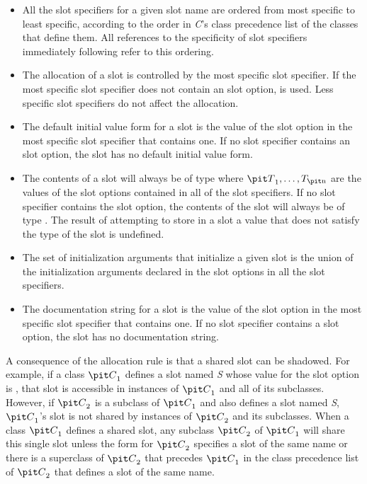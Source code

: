 \begin{itemize}

\item  All the slot specifiers for a given slot name are ordered
from most specific to least specific, according to the order in {\it C\/}'s
class precedence list of the classes that define them. All references
to the specificity of slot specifiers immediately following refer to this
ordering.

\item  The allocation of a slot is controlled by the most specific
slot specifier.  If the most specific slot specifier does not contain an
 slot option,  is used.  Less specific
slot specifiers do not affect the allocation.

\item  The default initial value form for a
slot is the value of the  slot option in the most
specific slot specifier that contains one.  If no slot specifier
contains an  slot option, the slot has no default
initial value form.

\item  The contents of a slot will always be of type 
where ${\it T}\sub 1, \ldots, T\sub {\hbox{\scriptsize\it n}}$ are
the values of the  slot options contained in all of the slot
specifiers.  If no slot specifier contains the  slot option, the
contents of the slot will always be of type . The result
of attempting to store in a slot
a value that does not satisfy the type of the slot is undefined.

\item  The set of initialization arguments that initialize a given
slot is the union of the initialization arguments declared in the 
 slot options in all the slot specifiers.

\item  The documentation string for a slot is the value of the
 slot option in the most specific slot specifier
that contains one.  If no slot specifier contains a 
 slot option, the slot has no documentation string.
\end{itemize}

A consequence of the allocation rule is that a shared slot can be
shadowed.  For example, if a class ${\it C}\sub 1$ defines a slot named {\it S}
whose value for the  slot option is ,
that slot is accessible in instances of ${\it C}\sub 1$ and all of its
subclasses.  However, if ${\it C}\sub 2$ is a subclass of ${\it C}\sub 1$ and also
defines a slot named {\it S}, ${\it C}\sub 1$'s slot is not shared
by instances of ${\it C}\sub 2$ and its subclasses. When a class
${\it C}\sub 1$ defines a shared slot, any subclass ${\it C}\sub 2$ of ${\it C}\sub
1$ will share this single slot unless the  form for
${\it C}\sub 2$ specifies a slot of the same name or there is a superclass
of ${\it C}\sub 2$ that precedes ${\it C}\sub 1$ in the class precedence list of
${\it C}\sub 2$ that defines a slot of the same name.

